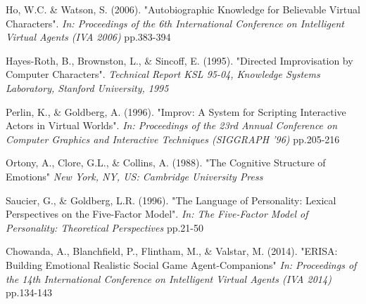 \documentclass{sig-alternate-05-2015}
\begin{document}
\begin{thebibliography}{20}
Ho, W.C. \& Watson, S. (2006).
"Autobiographic Knowledge for Believable Virtual Characters".
\textit{In: Proceedings of the 6th International Conference on Intelligent Virtual Agents (IVA 2006)} pp.383-394

Hayes-Roth, B., Brownston, L., \& Sincoff, E. (1995).
"Directed Improvisation by Computer Characters".
\textit{Technical Report KSL 95-04, Knowledge Systems Laboratory, Stanford University, 1995}

Perlin, K., \& Goldberg, A. (1996).
"Improv: A System for Scripting Interactive Actors in Virtual Worlds".
\textit{In: Proceedings of the 23rd Annual Conference on Computer Graphics and Interactive Techniques (SIGGRAPH '96)} pp.205-216

Ortony, A., Clore, G.L., \& Collins, A. (1988).
"The Cognitive Structure of Emotions"
\textit{New York, NY, US: Cambridge University Press}

Saucier, G., \& Goldberg, L.R. (1996).
"The Language of Personality: Lexical Perspectives on the Five-Factor Model".
\textit{In: The Five-Factor Model of Personality:
Theoretical Perspectives} pp.21-50

Chowanda, A., Blanchfield, P., Flintham, M., \& Valstar, M. (2014). 
"ERISA: Building Emotional Realistic Social Game Agent-Companions"
\textit{In: Proceedings of the 14th International Conference on Intelligent Virtual Agents (IVA 2014)} pp.134-143 




\end{thebibliography}
 
\end{document}
